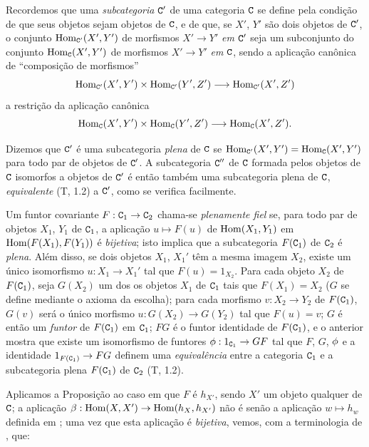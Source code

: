 \begin{env}[8.1.5]
\label{0.8.1.5}
Recordemos que uma \emph{subcategoria} $\mathtt{C}'$ de uma categoria $\mathtt{C}$ se define pela condição de que seus objetos
sejam objetos de $\mathtt{C}$, e de que, se $X'$, $Y'$ são dois objetos de $\mathtt{C}'$, o conjunto
$\operatorname{Hom}_{\mathtt{C}'}(X',Y')$ de morfismos $X'\to Y'$ \emph{em $\mathtt{C}'$} seja um subconjunto do conjunto $\operatorname{Hom}_\mathtt{C}(X',Y')$ de
morfismos $X'\to Y'$ \emph{em $\mathtt{C}$}, sendo a aplicação canônica de ``composição de morfismos''
\[
  \Hom_{\C'}(X',Y')\times\Hom_{\C'}(Y',Z')\to\Hom_{\C'}(X',Z')
\]
a restrição da aplicação canônica
\[
  \Hom_\C(X',Y')\times\Hom_\C(Y',Z')\to\Hom_\C(X',Z').
\]

Dizemos que $\mathtt{C}'$ é uma subcategoria \emph{plena} de $\mathtt{C}$ se $\operatorname{Hom}_{\mathtt{C}'}(X',Y')=\operatorname{Hom}_\mathtt{C}(X',Y')$ para todo
par de objetos de $\mathtt{C}'$. A subcategoria $\mathtt{C}''$ de $\mathtt{C}$ formada pelos objetos de $\mathtt{C}$ isomorfos a
objetos de $\mathtt{C}'$ é então também uma subcategoria plena de $\mathtt{C}$, \emph{equivalente} (T, 1.2) a $\mathtt{C}'$, como se
verifica facilmente.

Um funtor covariante $F:\C_1\to\C_2$ chama-se \emph{plenamente fiel} se, para todo par de objetos
$X_1$, $Y_1$ de $\mathtt{C}_1$, a aplicação $u\mapsto F(u)$ de $\operatorname{Hom}(X_1,Y_1)$ em $\operatorname{Hom}(F(X_1),F(Y_1))$ é
\emph{bijetiva}; isto implica que a subcategoria $F(\mathtt{C}_1)$ de $\mathtt{C}_2$ é \emph{plena}. Além disso,
se dois objetos $X_1$, $X_1'$ têm a mesma imagem $X_2$, existe um único isomorfismo
$u:X_1\to X_1'$ tal que $F(u)=1_{X_2}$. Para cada objeto $X_2$ de $F(\mathtt{C}_1)$, seja $G(X_2)$ um dos
os objetos $X_1$ de $\mathtt{C}_1$ tais que $F(X_1)=X_2$ ($G$ se define mediante o axioma da escolha); para
cada morfismo $v:X_2\to Y_2$ de $F(\mathtt{C}_1)$, $G(v)$ será o único morfismo $u:G(X_2)\to G(Y_2)$ tal
que $F(u)=v$; $G$ é então um \emph{funtor} de $F(\mathtt{C}_1)$ em $\mathtt{C}_1$; $FG$ é o funtor identidade de
$F(\mathtt{C}_1)$, e o anterior mostra que existe um isomorfismo de funtores $\vphi:1_{\C_1}\to GF$
tal que $F$, $G$, $\phi$ e a identidade $1_{F(\C_1)}\to FG$ definem uma \emph{equivalência} entre
a categoria $\mathtt{C}_1$ e a subcategoria plena $F(\mathtt{C}_1)$ de $\mathtt{C}_2$ (T, 1.2).
\end{env}

\begin{env}[8.1.6]
\label{0.8.1.6}
Aplicamos a Proposição  ao caso em que $F$ é $h_{X'}$, sendo $X'$ um
objeto qualquer de $\mathtt{C}$; a aplicação $\beta:\Hom(X,X')\to\Hom(h_X,h_{X'})$ não é senão a aplicação
$w\mapsto h_w$ definida em ; uma vez que esta aplicação é \emph{bijetiva}, vemos,
com a terminologia de , que:
\end{env}

